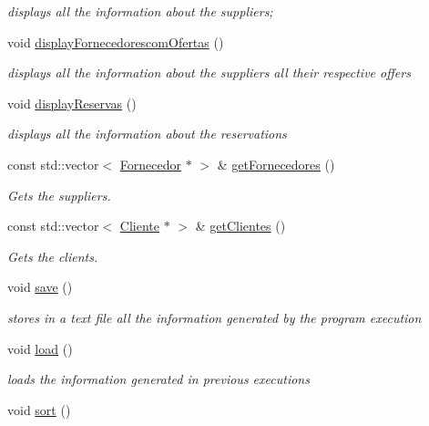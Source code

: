 \begin{DoxyCompactItemize}
\begin{DoxyCompactList}\small\item\em displays all the information about the suppliers; \end{DoxyCompactList}\item 
void \hyperlink{classEmpresa_aa47e9a64800a41180b7f374b73a1f32b}{display\+Fornecedorescom\+Ofertas} ()
\begin{DoxyCompactList}\small\item\em displays all the information about the suppliers all their respective offers \end{DoxyCompactList}\item 
void \hyperlink{classEmpresa_a8c89e6053eaccf0e1938a4f2ab0bfdc4}{display\+Reservas} ()
\begin{DoxyCompactList}\small\item\em displays all the information about the reservations \end{DoxyCompactList}\item 
const std\+::vector$<$ \hyperlink{classFornecedor}{Fornecedor} $\ast$ $>$ \& \hyperlink{classEmpresa_aaf131a375aa70819205744328a4dbc07}{get\+Fornecedores} ()
\begin{DoxyCompactList}\small\item\em Gets the suppliers. \end{DoxyCompactList}\item 
const std\+::vector$<$ \hyperlink{classCliente}{Cliente} $\ast$ $>$ \& \hyperlink{classEmpresa_a472beae89ee1187e1ec3f70e9d4a99ef}{get\+Clientes} ()
\begin{DoxyCompactList}\small\item\em Gets the clients. \end{DoxyCompactList}\item 
void \hyperlink{classEmpresa_afbde694da902870437443de43dae8071}{save} ()
\begin{DoxyCompactList}\small\item\em stores in a text file all the information generated by the program execution \end{DoxyCompactList}\item 
void \hyperlink{classEmpresa_a3445c3c507b4f45d1d7831908ff4cdf1}{load} ()
\begin{DoxyCompactList}\small\item\em loads the information generated in previous executions \end{DoxyCompactList}\item 
void \hyperlink{classEmpresa_aa7424cde3bdf1b1921967bc176d0ab50}{sort} ()

\end{DoxyCompactItemize}
